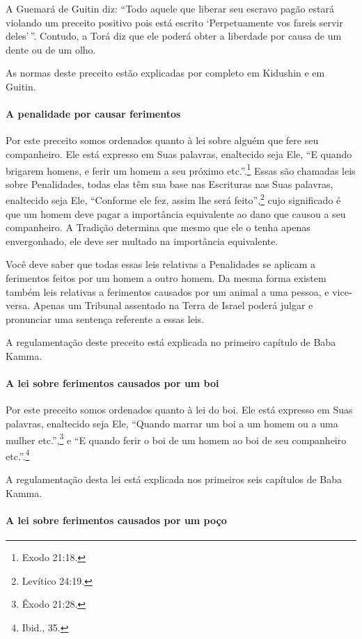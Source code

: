 A Guemará de Guitin diz: ``Todo aquele que liberar seu escravo pagão
estará violando um preceito positivo pois está escrito `Perpetuamente
vos fareis servir deles'\,''. Contudo, a Torá diz que ele poderá obter a
liberdade por causa de um dente ou de um olho.

As normas deste preceito estão explicadas por completo em Kidushin e em
Guitin.

\paragraph{A penalidade por causar ferimentos}

Por este preceito somos ordenados quanto à lei sobre alguém que fere seu
companheiro. Ele está expresso em Suas palavras, enaltecido seja Ele,
``E quando brigarem homens, e ferir um homem a seu próximo etc.''.\footnote{Exodo
21:18.} Essas são chamadas leis sobre Penalidades, todas elas têm sua
base nas Escrituras nas Suas palavras, enaltecido seja Ele, ``Conforme
ele fez, assim lhe será feito'',\footnote{Levítico 24:19.} cujo significado é que
um homem deve pagar a importância equivalente ao dano que causou a seu
companheiro. A Tradição determina que mesmo que ele o tenha apenas
envergonhado, ele deve ser multado na importância equivalente.

Você deve saber que todas essas leis relativas a Penalidades se aplicam
a ferimentos feitos por um homem a outro homem. Da mesma forma existem também leis relativas a ferimentos causados por um animal a uma
pessoa, e vice-versa. Apenas um Tribunal assentado na Terra de Israel
poderá julgar e pronunciar uma sentença referente a essas leis.

A regulamentação deste preceito está explicada no primeiro capítulo de
Baba Kamma.

\paragraph{A lei sobre ferimentos causados por um boi}

Por este preceito somos ordenados quanto à lei do boi. Ele está
expresso em Suas palavras, enaltecido seja Ele, ``Quando marrar um boi
a um homem ou a uma mulher etc.'',\footnote{Êxodo 21:28.} e ``E quando ferir o
boi de um homem ao boi de seu companheiro etc.''.\footnote{Ibid., 35.}

A regulamentação desta lei está explicada nos primeiros seis capítulos
de Baba Kamma.

\paragraph{A lei sobre ferimentos causados por um poço}


